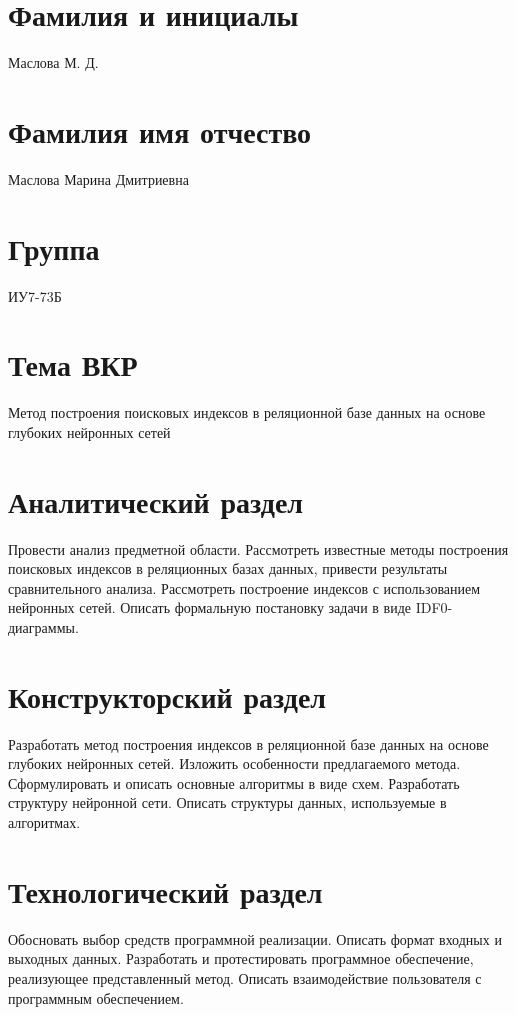 \documentclass{bmstu}
\begin{document}
\section*{Фамилия и инициалы}

Маслова М. Д.

\section*{Фамилия имя отчество}

Маслова Марина Дмитриевна

\section*{Группа}

ИУ7-73Б

\section*{Тема ВКР}

Метод построения поисковых индексов в реляционной базе данных на основе глубоких
нейронных сетей

\section*{Аналитический раздел}

Провести анализ предметной области. Рассмотреть известные методы построения
поисковых индексов в реляционных базах данных, привести результаты
сравнительного анализа. Рассмотреть построение индексов с использованием
нейронных сетей. Описать формальную постановку задачи в виде IDF0-диаграммы.

\section*{Конструкторский раздел}

Разработать метод построения индексов в реляционной базе данных на основе
глубоких нейронных сетей. Изложить особенности предлагаемого метода.
Сформулировать и описать основные алгоритмы в виде схем. Разработать структуру
нейронной сети. Описать структуры данных, используемые в алгоритмах.

\section*{Технологический раздел}

Обосновать выбор средств программной реализации. Описать формат входных и
выходных данных. Разработать и протестировать программное обеспечение,
реализующее представленный метод. Описать взаимодействие
пользователя с программным обеспечением.
\end{document}
